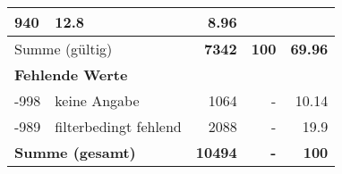\begin{longtable}{lXrrr}
       \num{940} &
       \num[round-mode=places,round-precision=2]{12,8} &
         \num[round-mode=places,round-precision=2]{8,96} \\
     \midrule
     \multicolumn{2}{l}{Summe (gültig)} &
       \textbf{\num{7342}} &
     \textbf{100} &
       \textbf{\num[round-mode=places,round-precision=2]{69,96}} \\
     \multicolumn{5}{l}{\textbf{Fehlende Werte}}\\
       -998 &
       keine Angabe &
         \num{1064} &
        - &
         \num[round-mode=places,round-precision=2]{10,14} \\
       -989 &
       filterbedingt fehlend &
         \num{2088} &
        - &
         \num[round-mode=places,round-precision=2]{19,9} \\
     \midrule
     \multicolumn{2}{l}{\textbf{Summe (gesamt)}} &
          \textbf{\num{10494}} &
        \textbf{-} &
        \textbf{100} \\
     \bottomrule
     \end{longtable}
     

